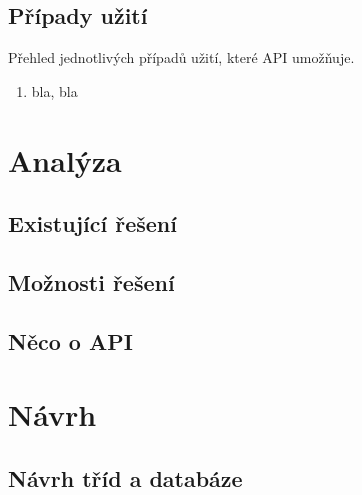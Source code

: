\documentclass[thesis=B,czech]{FITthesis}[2012/06/26]
\begin{document}
\section{Případy užití}


Přehled jednotlivých případů užití, které API umožňuje.

\begin{enumerate}
\item bla, bla
\end{enumerate}

\chapter{Analýza}

\section{Existující řešení}


\section{Možnosti řešení}


\section{Něco o API}


\chapter{Návrh}

\section{Návrh tříd a databáze}

\end{document}
